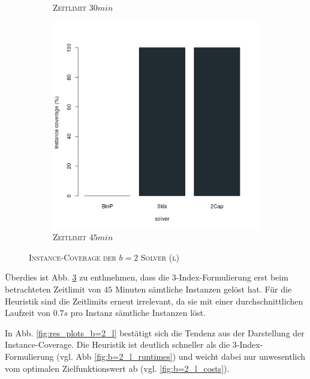 \begin{figure}[H]
\begin{subfigure}[b]{0.3\textwidth}
\caption{\textsc{Zeitlimit} $30min$}
\label{fig:instance_cov_b=2_l_b}
\end{subfigure}
\hfill
\begin{subfigure}[b]{0.3\textwidth}
\centering
\includegraphics[width=1.2\textwidth]{img/solver_instance_coverage_b=2_l_2700s.png}
\caption{\textsc{Zeitlimit} $45min$}
\label{fig:instance_cov_b=2_l_c}
\end{subfigure}

\caption{\textsc{Instance-Coverage der $b=2$ Solver (l)}}
\label{fig:instance_cov_b=2_l}
\end{figure}

Überdies ist Abb. \ref{fig:instance_cov_b=2_l} zu enthnehmen, dass die 3-Index-Formulierung erst beim betrachteten
Zeitlimit von $45$ Minuten sämtliche Instanzen gelöst hat. Für die Heuristik sind die Zeitlimits erneut irrelevant,
da sie mit einer durchschnittlichen Laufzeit von $0.7s$ pro Instanz sämtliche Instanzen löst.

In Abb. \ref{fig:res_plots_b=2_l} bestätigt sich die Tendenz aus der Darstellung der Instance-Coverage.
Die Heuristik ist deutlich schneller als die 3-Index-Formulierung (vgl. Abb \ref{fig:b=2_l_runtimes}) und weicht dabei nur
unwesentlich vom optimalen Zielfunktionswert ab (vgl. \ref{fig:b=2_l_costs}).

